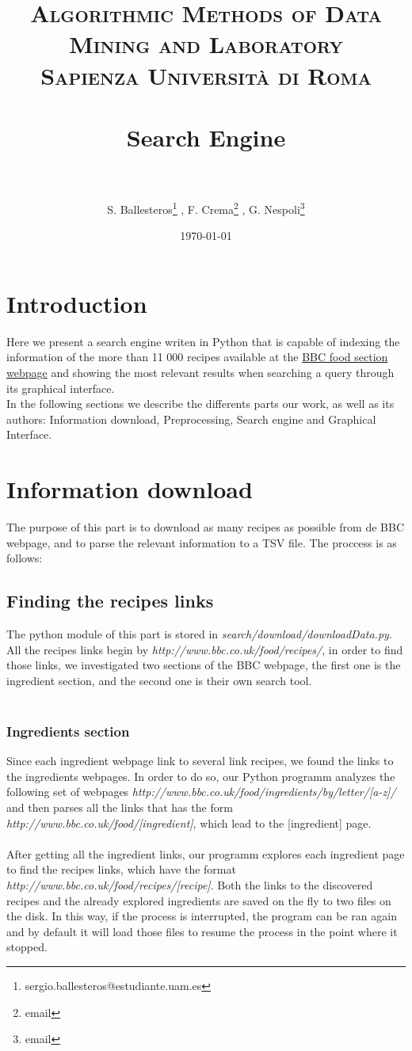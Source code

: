 \documentclass[paper=a4, fontsize=11pt]{scrartcl} %
\title{	
\normalfont \normalsize 
\textsc{Algorithmic Methods of Data Mining and Laboratory} \\ [25pt] %
\textsc{Sapienza Università di Roma} \\ [25pt]
\horrule{0.5pt} \\[0.4cm] %
\huge Search Engine\\ %
\horrule{2pt} \\[0.5cm] %
}
\author{S. Ballesteros\footnote{sergio.ballesteros@estudiante.uam.es} , F. Crema\footnote{email} , G. Nespoli\footnote{email}} %
\date{\normalsize\today} %
\numberwithin{equation}{section} %
\numberwithin{figure}{section} %
\numberwithin{table}{section} %
\begin{document}
\maketitle %


\section{Introduction}
Here we present a search engine writen in Python that is capable of indexing the information of the more than 11 000 recipes available at the \href{http://www.bbc.co.uk/food/recipes/}{BBC  food section webpage} and showing the most relevant results when searching a query through its graphical interface. \\
In the following sections we describe the differents parts our work, as well as its authors: Information download, Preprocessing, Search engine and Graphical Interface.

\section{Information download}
The purpose of this part is to download as many recipes as possible from de BBC webpage, and to parse the relevant information to a TSV file. The proccess is as follows:
\subsection{Finding the recipes links}
The python module of this part is stored in \textit{search/download/downloadData.py}. All the recipes links begin by \textit{http://www.bbc.co.uk/food/recipes/}, in order to find those links, we investigated two sections of the BBC webpage, the first one is the ingredient section, and the second one is their own search tool. \\\
\subsubsection{Ingredients section}
Since each ingredient webpage link to several link recipes, we found the links to the ingredients webpages. In order to do so, our Python programm analyzes the following set of webpages \textit{http://www.bbc.co.uk/food/ingredients/by/letter/[a-z]/} and then parses all the links that has the form \textit{http://www.bbc.co.uk/food/[ingredient]}, which lead to the [ingredient] page. \\ \\
After getting all the ingredient links, our programm explores each ingredient page to find the recipes links, which have the format \textit{http://www.bbc.co.uk/food/recipes/[recipe]}. Both the links to the discovered recipes and the already explored ingredients are saved on the fly to two files on the disk. In this way, if the process is interrupted, the program can be ran again and by default it will load those files to resume the process in the point where it stopped.
\end{document}
